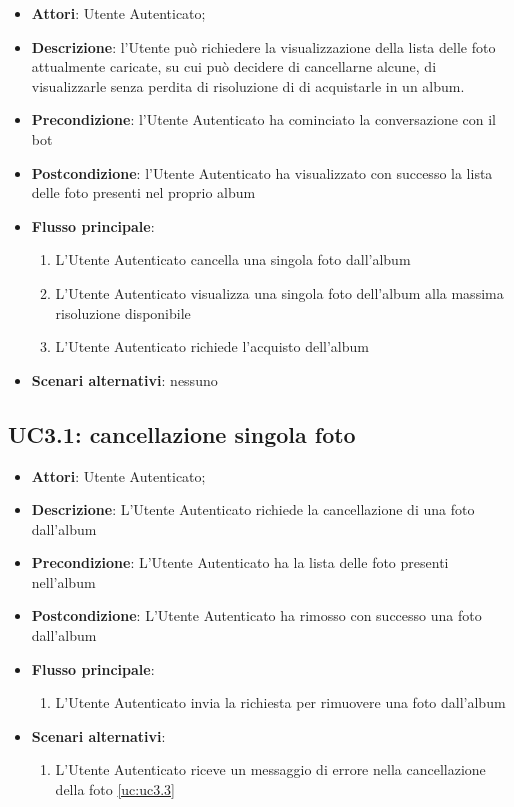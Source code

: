 \begin{itemize}
  \item \textbf{Attori}: Utente Autenticato;
  \item \textbf{Descrizione}: l'Utente può richiedere la visualizzazione della
lista delle foto attualmente caricate, su cui può decidere di cancellarne
alcune, di visualizzarle senza perdita di risoluzione di di acquistarle in un
album.
  \item \textbf{Precondizione}: l'Utente Autenticato ha cominciato la
conversazione con il bot
  \item \textbf{Postcondizione}: l'Utente Autenticato ha visualizzato con
successo la lista delle foto presenti nel proprio album
  \item \textbf{Flusso principale}:
  \begin{enumerate}
    \item L'Utente Autenticato cancella una singola foto dall'album
    \item L'Utente Autenticato visualizza una singola foto dell'album alla
massima risoluzione disponibile
    \item L'Utente Autenticato richiede l'acquisto dell'album
  \end{enumerate}
  \item \textbf{Scenari alternativi}: nessuno
\end{itemize}



\subsection{UC3.1: cancellazione singola foto}
\label{uc:uc3.1}


\begin{itemize}
  \item \textbf{Attori}: Utente Autenticato;
  \item \textbf{Descrizione}: L'Utente Autenticato richiede la cancellazione di
una foto dall'album
  \item \textbf{Precondizione}: L'Utente Autenticato ha la lista delle foto
presenti nell'album
  \item \textbf{Postcondizione}: L'Utente Autenticato ha rimosso con successo
una foto dall'album
  \item \textbf{Flusso principale}:
  \begin{enumerate}
    \item L'Utente Autenticato invia la richiesta per rimuovere una foto
dall'album
  \end{enumerate}
  \item \textbf{Scenari alternativi}:
  \begin{enumerate}
    \item L'Utente Autenticato riceve un messaggio di errore nella
cancellazione della foto \ref{uc:uc3.3}
  \end{enumerate}
\end{itemize}


